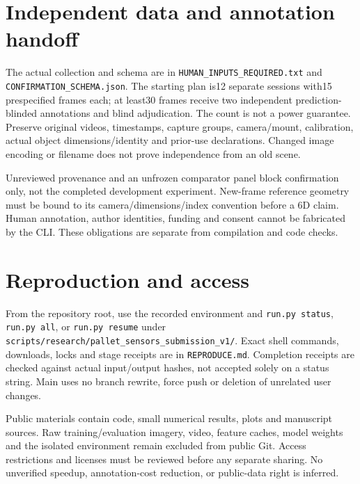 \documentclass[10pt]{article}
\begin{document}
\section{Independent data and annotation handoff}
The actual collection and schema are in \texttt{HUMAN\_INPUTS\_REQUIRED.txt} and \texttt{CONFIRMATION\_SCHEMA.json}. The starting plan is12 separate sessions with15 prespecified frames each; at least30 frames receive two independent prediction-blinded annotations and blind adjudication. The count is not a power guarantee. Preserve original videos, timestamps, capture groups, camera/mount, calibration, actual object dimensions/identity and prior-use declarations. Changed image encoding or filename does not prove independence from an old scene.

Unreviewed provenance and an unfrozen comparator panel block confirmation only, not the completed development experiment. New-frame reference geometry must be bound to its camera/dimensions/index convention before a 6D claim. Human annotation, author identities, funding and consent cannot be fabricated by the CLI. These obligations are separate from compilation and code checks.
\section{Reproduction and access}
From the repository root, use the recorded environment and \texttt{run.py status}, \texttt{run.py all}, or \texttt{run.py resume} under \texttt{scripts/research/pallet\_sensors\_submission\_v1/}. Exact shell commands, downloads, locks and stage receipts are in \texttt{REPRODUCE.md}. Completion receipts are checked against actual input/output hashes, not accepted solely on a status string. Main uses no branch rewrite, force push or deletion of unrelated user changes.

Public materials contain code, small numerical results, plots and manuscript sources. Raw training/evaluation imagery, video, feature caches, model weights and the isolated environment remain excluded from public Git. Access restrictions and licenses must be reviewed before any separate sharing. No unverified speedup, annotation-cost reduction, or public-data right is inferred.
\end{document}
